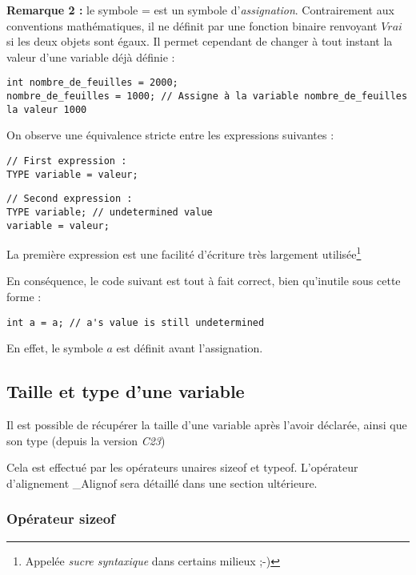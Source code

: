 \documentclass[../../../main.tex]{subfiles}
\begin{document}
\textbf{Remarque 2 :} le symbole \textsf{=} est un symbole d'\textit{assignation}. Contrairement aux conventions mathématiques, il ne définit par une fonction binaire renvoyant $Vrai$ si les deux objets sont égaux. Il permet cependant de changer à tout instant la valeur d'une variable déjà définie :
\begin{verbatim}
int nombre_de_feuilles = 2000;
nombre_de_feuilles = 1000; // Assigne à la variable nombre_de_feuilles la valeur 1000
\end{verbatim}
On observe une équivalence stricte entre les expressions suivantes : 

\begin{minipage}{0.5\textwidth}
\begin{verbatim}
// First expression :
TYPE variable = valeur;

\end{verbatim}
\end{minipage}
\begin{minipage}{0.5\textwidth}
\begin{verbatim}
// Second expression :
TYPE variable; // undetermined value
variable = valeur;
\end{verbatim}
\end{minipage}

La première expression est une facilité d'écriture très largement utilisée\footnote{Appelée \textit{sucre syntaxique} dans certains milieux ;-)}
 
En conséquence, le code suivant est tout à fait correct, bien qu'inutile sous cette forme :
\begin{verbatim}
int a = a; // a's value is still undetermined
\end{verbatim}
En effet, le symbole $a$ est définit avant l'assignation.
\subsection{Taille et type d'une variable}
Il est possible de récupérer la taille d'une variable après l'avoir déclarée, ainsi que son type (depuis la version \textit{C23})
 
Cela est effectué par les opérateurs unaires \textsf{sizeof} et \textsf{typeof}. L'opérateur d'alignement \textsf{\_Alignof} sera détaillé dans une section ultérieure.
 
\subsubsection{Opérateur \textsf{sizeof}}
 
\end{document}
